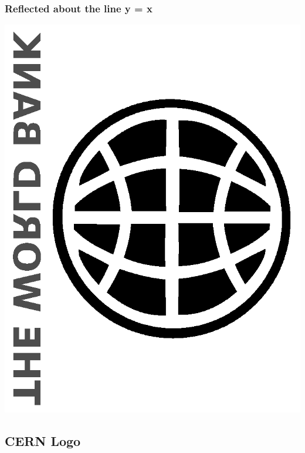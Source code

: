 \documentclass[11pt]{article}
\begin{document}
\subsubsection{Reflected about the line y = x}
\label{sec:org84ea4ef}
\begin{center}
\includegraphics[width=.9\linewidth]{./images/world_bank_logo_reflected_about_line_y_equal_x.png}
\end{center}

\subsection{CERN Logo}
\label{sec:org09c5441}
\end{document}
